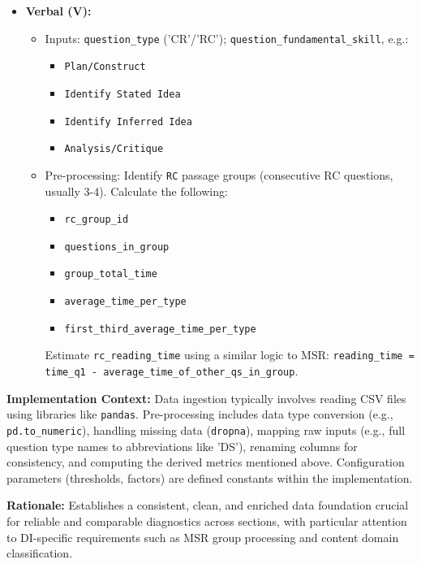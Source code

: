 \documentclass{article}
\begin{document}
\begin{itemize}
\begin{itemize}
    \end{itemize}
    \item \textbf{Verbal (V):}
    \begin{itemize}
        \item Inputs: \texttt{question\_type} ('CR'/'RC'); \texttt{question\_fundamental\_skill}, e.g.:
            \begin{itemize}
                \item \texttt{Plan/Construct}
                \item \texttt{Identify Stated Idea}
                \item \texttt{Identify Inferred Idea}
                \item \texttt{Analysis/Critique}
            \end{itemize}
        \item Pre-processing: Identify \texttt{RC} passage groups (consecutive RC questions, usually 3-4). Calculate the following:
            \begin{itemize}
                \item \texttt{rc\_group\_id}
                \item \texttt{questions\_in\_group}
                \item \texttt{group\_total\_time}
                \item \texttt{average\_time\_per\_type}
                \item \texttt{first\_third\_average\_time\_per\_type}
            \end{itemize}
            Estimate \texttt{rc\_reading\_time} using a similar logic to MSR:
            \texttt{reading\_time = time\_q1 - average\_time\_of\_other\_qs\_in\_group}.
    \end{itemize}
\end{itemize}

\textbf{Implementation Context:} Data ingestion typically involves reading CSV files using libraries like \texttt{pandas}. Pre-processing includes data type conversion (e.g., \texttt{pd.to\_numeric}), handling missing data (\texttt{dropna}), mapping raw inputs (e.g., full question type names to abbreviations like 'DS'), renaming columns for consistency, and computing the derived metrics mentioned above. Configuration parameters (thresholds, factors) are defined constants within the implementation.

\textbf{Rationale:} Establishes a consistent, clean, and enriched data foundation crucial for reliable and comparable diagnostics across sections, with particular attention to DI-specific requirements such as MSR group processing and content domain classification.
\end{document}
